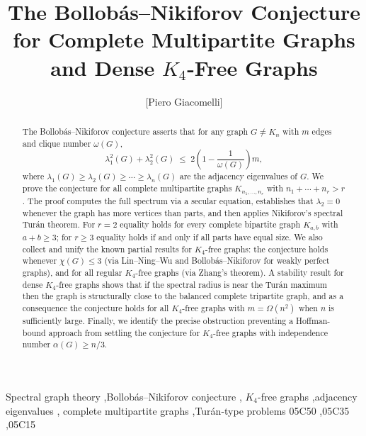 \documentclass[preprint,12pt]{elsarticle}
\theoremstyle{plain}
\theoremstyle{definition}
\begin{document}
\begin{frontmatter}

\title{The Bollob\'{a}s--Nikiforov Conjecture for Complete Multipartite
       Graphs and Dense $K_4$-Free Graphs}

\author[inst1]{[Piero Giacomelli]}
\address[inst1]{IT Department, TENAX GROUP SPA, Verona, Italy}

\begin{abstract}
The Bollob\'as--Nikiforov conjecture asserts that for any graph
$G \neq K_n$ with $m$ edges and clique number $\omega(G)$,
\[
  \lambda_1^2(G) + \lambda_2^2(G)
  \;\leq\;
  2\!\left(1 - \frac{1}{\omega(G)}\right)m,
\]
where $\lambda_1(G) \geq \lambda_2(G) \geq \cdots \geq \lambda_n(G)$
are the adjacency eigenvalues of $G$.
We prove the conjecture for all complete multipartite graphs
$K_{n_1,\ldots,n_r}$ with $n_1 + \cdots + n_r > r$.
The proof computes the full spectrum via a secular equation, establishes
that $\lambda_2 = 0$ whenever the graph has more vertices than parts,
and then applies Nikiforov's spectral Tur\'an theorem.
For $r = 2$ equality holds for every complete bipartite graph $K_{a,b}$
with $a + b \geq 3$; for $r \geq 3$ equality holds if and only if all
parts have equal size.
We also collect and unify the known partial results for $K_4$-free graphs:
the conjecture holds whenever $\chi(G) \leq 3$ (via Lin--Ning--Wu and
Bollob\'as--Nikiforov for weakly perfect graphs), and for all regular
$K_4$-free graphs (via Zhang's theorem).
A stability result for dense $K_4$-free graphs shows that if the spectral
radius is near the Tur\'an maximum then the graph is structurally close
to the balanced complete tripartite graph, and as a consequence the
conjecture holds for all $K_4$-free graphs with $m = \Omega(n^2)$
when $n$ is sufficiently large.
Finally, we identify the precise obstruction preventing a Hoffman-bound
approach from settling the conjecture for $K_4$-free graphs with
independence number $\alpha(G) \geq n/3$.
\end{abstract}

\begin{keyword}
Spectral graph theory \sep Bollob\'as--Nikiforov conjecture \sep
$K_4$-free graphs \sep adjacency eigenvalues \sep
complete multipartite graphs \sep Tur\'an-type problems
\MSC[2020] 05C50 \sep 05C35 \sep 05C15
\end{keyword}

\end{frontmatter}
\end{document}

